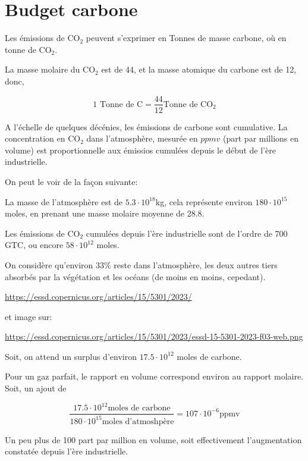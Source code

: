 \section{Budget carbone}

Les émissions de CO$_2$ peuvent s'exprimer en Tonnes de masse carbone, où en tonne de CO$_2$. 

La masse molaire du CO$_2$ est de 44, et la masse atomique du  carbone est de 12, donc,

\begin{equation}
  \text{1 Tonne de C}=\frac{44}{12} \text{Tonne de CO$_2$}
\end{equation}

A l'échelle de quelques décénies, les émissions de carbone sont cumulative. La concentration en CO$_2$ dans l'atmosphère, mesurée en $ppmv$ (part par millions en volume) est proportionnelle aux émissios cumulées depuis le début de l'ère industrielle. 

On peut le voir de la façon suivante: 

La masse de l'atmosphère est de $5.3 \cdot 10^{18}$kg, cela représente environ $180 \cdot 10^{15}$ moles, en prenant une masse molaire moyenne de 28.8. 


Les émissions de CO$_2$ cumulées depuis l'ère industrielle sont de l'ordre de 700 GTC, ou encore $58 \cdot 10^{12}$ moles. 

On considère qu'environ 33\% reste dans l'atmosphère, les deux autres tiers absorbés par la végétation et les océans (de moins en moins, cepedant). 

\url{https://essd.copernicus.org/articles/15/5301/2023/}

et image sur:

\url{https://essd.copernicus.org/articles/15/5301/2023/essd-15-5301-2023-f03-web.png}

Soit, on attend un surplus d'environ $17.5 \cdot 10^{12}$ moles de carbone. 

Pour un gaz parfait, le rapport en volume correspond environ au rapport molaire. Soit, un ajout de

\begin{equation*}
  \frac{17.5\cdot 10^{12} \text{moles de carbone}}{180 \cdot 10^{15} \text{moles d'atmoshpère}} = 107 \cdot 10^{-6} \text{ppmv}
\end{equation*}

Un peu plus de 100 part par million en volume, soit effectivement l'augmentation constatée depuis l'ère industrielle. 

